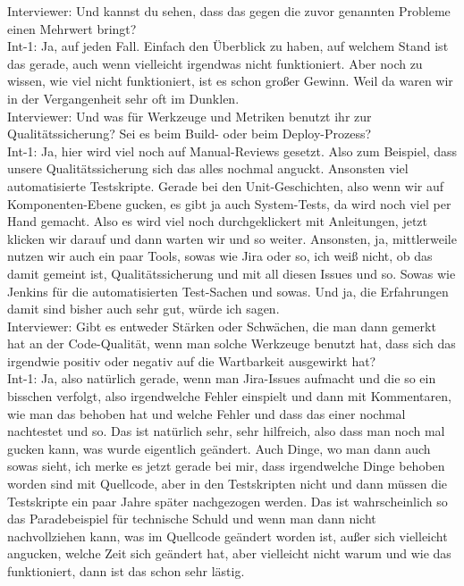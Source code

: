 Interviewer: Und kannst du sehen, dass das gegen die zuvor genannten Probleme einen Mehrwert bringt?\\
Int-1: Ja, auf jeden Fall. Einfach den Überblick zu haben, auf welchem Stand ist das gerade, auch wenn vielleicht irgendwas nicht funktioniert. Aber noch zu wissen, wie viel nicht funktioniert, ist es schon großer Gewinn. Weil da waren wir in der Vergangenheit sehr oft im Dunklen.\\
Interviewer: Und was für Werkzeuge und Metriken benutzt ihr zur Qualitätssicherung? Sei es beim Build- oder beim Deploy-Prozess?\\
Int-1: Ja, hier wird viel noch auf Manual-Reviews gesetzt. Also zum Beispiel, dass unsere Qualitätssicherung sich das alles nochmal anguckt. Ansonsten viel automatisierte Testskripte. Gerade bei den Unit-Geschichten, also wenn wir auf Komponenten-Ebene gucken, es gibt ja auch System-Tests, da wird noch viel per Hand gemacht. Also es wird viel noch durchgeklickert mit Anleitungen, jetzt klicken wir darauf und dann warten wir und so weiter. Ansonsten, ja, mittlerweile nutzen wir auch ein paar Tools, sowas wie Jira oder so, ich weiß nicht, ob das damit gemeint ist, Qualitätssicherung und mit all diesen Issues und so. Sowas wie Jenkins für die automatisierten Test-Sachen und sowas. Und ja, die Erfahrungen damit sind bisher auch sehr gut, würde ich sagen.\\
Interviewer: Gibt es entweder Stärken oder Schwächen, die man dann gemerkt hat an der Code-Qualität, wenn man solche Werkzeuge benutzt hat, dass sich das irgendwie positiv oder negativ auf die Wartbarkeit ausgewirkt hat?\\
Int-1: Ja, also natürlich gerade, wenn man Jira-Issues aufmacht und die so ein bisschen verfolgt, also irgendwelche Fehler einspielt und dann mit Kommentaren, wie man das behoben hat und welche Fehler und dass das einer nochmal nachtestet und so. Das ist natürlich sehr, sehr hilfreich, also dass man noch mal gucken kann, was wurde eigentlich geändert. Auch Dinge, wo man dann auch sowas sieht, ich merke es jetzt gerade bei mir, dass irgendwelche Dinge behoben worden sind mit Quellcode, aber in den Testskripten nicht und dann müssen die Testskripte ein paar Jahre später nachgezogen werden. Das ist wahrscheinlich so das Paradebeispiel für technische Schuld und wenn man dann nicht nachvollziehen kann, was im Quellcode geändert worden ist, außer sich vielleicht angucken, welche Zeit sich geändert hat, aber vielleicht nicht warum und wie das funktioniert, dann ist das schon sehr lästig.\\

